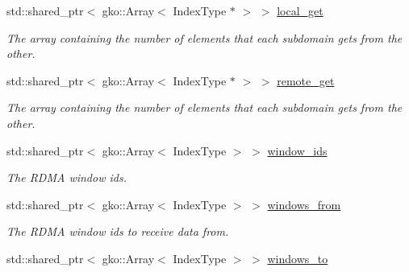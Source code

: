 \begin{DoxyCompactItemize}
std\+::shared\+\_\+ptr$<$ gko\+::\+Array$<$ Index\+Type $\ast$ $>$ $>$ \hyperlink{structSchwarzWrappers_1_1Communicate_1_1comm__struct_a6a639dca587e435f1843b87a849ff6a7}{local\+\_\+get}
\begin{DoxyCompactList}\small\item\em The array containing the number of elements that each subdomain gets from the other. \end{DoxyCompactList}\item 
std\+::shared\+\_\+ptr$<$ gko\+::\+Array$<$ Index\+Type $\ast$ $>$ $>$ \hyperlink{structSchwarzWrappers_1_1Communicate_1_1comm__struct_a64b5eabdeb27f804ff3c0fa81fb8e3a9}{remote\+\_\+get}
\begin{DoxyCompactList}\small\item\em The array containing the number of elements that each subdomain gets from the other. \end{DoxyCompactList}\item 
\mbox{\label{structSchwarzWrappers_1_1Communicate_1_1comm__struct_a4f4354c34fb0bcdc875a28b6b92966b4}} 
std\+::shared\+\_\+ptr$<$ gko\+::\+Array$<$ Index\+Type $>$ $>$ \hyperlink{structSchwarzWrappers_1_1Communicate_1_1comm__struct_a4f4354c34fb0bcdc875a28b6b92966b4}{window\+\_\+ids}
\begin{DoxyCompactList}\small\item\em The R\+D\+MA window ids. \end{DoxyCompactList}\item 
\mbox{\label{structSchwarzWrappers_1_1Communicate_1_1comm__struct_ac438e535c5da64797ac85cf0017f4b8b}} 
std\+::shared\+\_\+ptr$<$ gko\+::\+Array$<$ Index\+Type $>$ $>$ \hyperlink{structSchwarzWrappers_1_1Communicate_1_1comm__struct_ac438e535c5da64797ac85cf0017f4b8b}{windows\+\_\+from}
\begin{DoxyCompactList}\small\item\em The R\+D\+MA window ids to receive data from. \end{DoxyCompactList}\item 
\mbox{\label{structSchwarzWrappers_1_1Communicate_1_1comm__struct_a25bfa28fff81a8be0f48b876e872ae12}} 
std\+::shared\+\_\+ptr$<$ gko\+::\+Array$<$ Index\+Type $>$ $>$ \hyperlink{structSchwarzWrappers_1_1Communicate_1_1comm__struct_a25bfa28fff81a8be0f48b876e872ae12}{windows\+\_\+to}

\end{DoxyCompactItemize}
